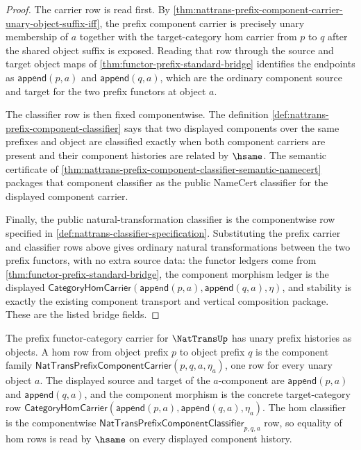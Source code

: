 \begin{proof}
The carrier row is read first. By
\autoref{thm:nattrans-prefix-component-carrier-unary-object-suffix-iff}, the
prefix component carrier is precisely unary membership of $a$ together with
the target-category hom carrier from $p$ to $q$ after the shared object suffix
is exposed. Reading that row through the source and target object maps of
\autoref{thm:functor-prefix-standard-bridge} identifies the endpoints as
$\mathsf{append}(p,a)$ and $\mathsf{append}(q,a)$, which are the ordinary
component source and target for the two prefix functors at object $a$.

The classifier row is then fixed componentwise. The definition
\autoref{def:nattrans-prefix-component-classifier} says that two displayed
components over the same prefixes and object are classified exactly when both
component carriers are present and their component histories are related by
$\hsame$. The semantic certificate of
\autoref{thm:nattrans-prefix-component-classifier-semantic-namecert} packages
that component classifier as the public NameCert classifier for the displayed
component carrier.

Finally, the public natural-transformation classifier is the componentwise row
specified in \autoref{def:nattrans-classifier-specification}. Substituting the
prefix carrier and classifier rows above gives ordinary natural
transformations between the two prefix functors, with no extra source data:
the functor ledgers come from \autoref{thm:functor-prefix-standard-bridge},
the component morphism ledger is the displayed
$\mathsf{CategoryHomCarrier}(\mathsf{append}(p,a),\mathsf{append}(q,a),\eta)$,
and stability is exactly the existing component transport and vertical
composition package. These are the listed bridge fields.
\end{proof}

\begin{definition}
\label{def:nattrans-functor-category-prefix-carrier}
The prefix functor-category carrier for $\NatTransUp$ has unary prefix
histories as objects. A hom row from object prefix $p$ to object prefix $q$
is the component family
$\mathsf{NatTransPrefixComponentCarrier}(p,q,a,\eta_a)$, one row for every
unary object $a$. The displayed source and target of the $a$-component are
$\mathsf{append}(p,a)$ and $\mathsf{append}(q,a)$, and the component morphism
is the concrete target-category row
$\mathsf{CategoryHomCarrier}(\mathsf{append}(p,a),\mathsf{append}(q,a),\eta_a)$.
The hom classifier is the componentwise
$\mathsf{NatTransPrefixComponentClassifier}_{p,q,a}$ row, so equality of hom
rows is read by $\hsame$ on every displayed component history.
\end{definition}

